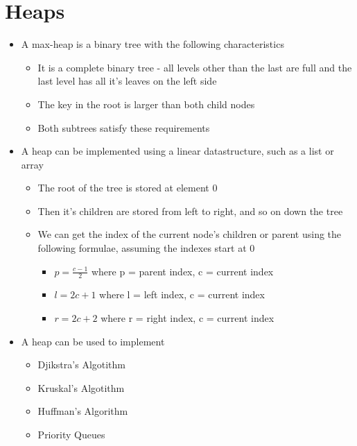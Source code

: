 
\section*{Heaps}

\begin{itemize}
  \item A max-heap is a binary tree with the following characteristics
  \begin{itemize}
    \item It is a complete binary tree - all levels other than the last are full and the last level has all it's leaves on the left side
    \item The key in the root is larger than both child nodes
    \item Both subtrees satisfy these requirements
  \end{itemize}
  \item A heap can be implemented using a linear datastructure, such as a list or array
  \begin{itemize}
    \item The root of the tree is stored at element 0
    \item Then it's children are stored from left to right, and so on down the tree
    \item We can get the index of the current node's children or parent using the following formulae, assuming the indexes start at 0
    \begin{itemize}
      \item $p = \frac{c - 1}{2}$ where p = parent index, c = current index
      \item $l = 2c + 1$ where l = left index, c = current index
      \item $r = 2c + 2$ where r = right index, c = current index
    \end{itemize}
  \end{itemize}
  \item A heap can be used to implement
  \begin{itemize}
    \item Djikstra's Algotithm
    \item Kruskal's Algotithm
    \item Huffman's Algorithm
    \item Priority Queues
  \end{itemize}
\end{itemize}

